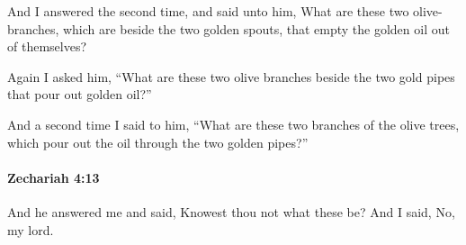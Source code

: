 			\begin{versebox}
					\item[BHS] 
					\item[LXX] 
					\item[ASV] And I answered the second time, and said unto him, What are these two olive-branches, which are beside the two golden spouts, that empty the golden oil out of themselves?
					\item[NIV] Again I asked him, “What are these two olive branches beside the two gold pipes that pour out golden oil?”
					\item[NRSV] And a second time I said to him, “What are these two branches of the olive trees, which pour out the oil through the two golden pipes?”
			\end{versebox}

		\paragraph{Zechariah 4:13} %
			\label{ZECHARIAH-4-13}

			And he answered me and said, Knowest thou not what these be? And I said, No, my lord.

